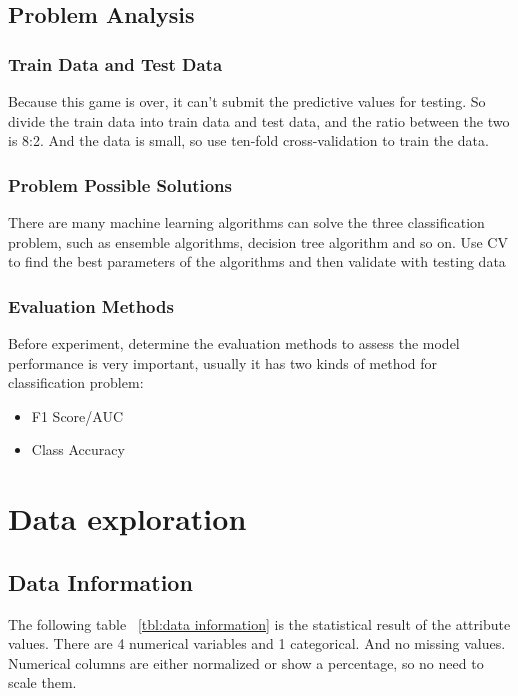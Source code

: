 \subsection{Problem Analysis}

\subsubsection{Train Data and Test Data}


Because this game is over, 
it can't submit the predictive values for testing. 
So divide the train data into train data and test data, 
and the ratio between the two is 8:2. 
And the data is small, 
so use ten-fold cross-validation 
to train the data.


\subsubsection{Problem Possible Solutions}


There are many machine learning algorithms 
can solve the three classification problem,
such as ensemble algorithms,
decision tree algorithm and so on.
Use CV to find the best parameters of the algorithms 
and then validate with testing data 


\subsubsection{Evaluation Methods}


Before experiment, determine the evaluation methods
to assess the model performance is very important,
usually it has two kinds of method for classification problem:

\begin{itemize}
	\item F1 Score/AUC
	\item Class Accuracy
\end{itemize} 


\section{Data exploration} \label{sec-data_exploration}

\subsection{Data Information}


The following table ~\cref{tbl:data information}
is the statistical result of the attribute values.
There are 4 numerical variables and 1 categorical. 
And no missing values.
Numerical columns are either normalized or show a percentage, 
so no need to scale them. 


